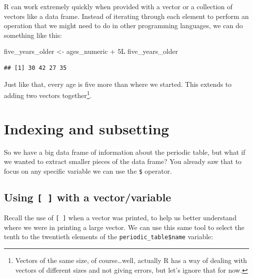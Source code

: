 \documentclass[]{tufte-book}
\newenvironment{Shaded}{\begin{snugshade}}{\end{snugshade}}
\newcommand{\DecValTok}[1]{\textcolor[rgb]{0.00,0.00,0.81}{#1}}
\newcommand{\NormalTok}[1]{#1}
\newcommand{\OtherTok}[1]{\textcolor[rgb]{0.56,0.35,0.01}{#1}}
\newcommand{\SpecialCharTok}[1]{\textcolor[rgb]{0.00,0.00,0.00}{#1}}
\begin{document}
R can work extremely quickly when provided with a vector or a collection of vectors like a data frame. Instead of iterating through each element to perform an operation that we might need to do in other programming languages, we can do something like this:

\begin{Shaded}
\begin{Highlighting}[]
\NormalTok{five\_years\_older }\OtherTok{\textless{}{-}}\NormalTok{ ages\_numeric }\SpecialCharTok{+}\NormalTok{ 5L}
\NormalTok{five\_years\_older}
\end{Highlighting}
\end{Shaded}

\begin{verbatim}
## [1] 30 42 27 35
\end{verbatim}

Just like that, every age is five more than where we started. This extends to adding two vectors together\footnote{Vectors of the same size, of course\ldots well, actually R has a way of dealing with vectors of different sizes and not giving errors, but let's ignore that for now.}.

\hypertarget{index-sub}{%
\section{Indexing and subsetting}\label{index-sub}}

So we have a big data frame of information about the periodic table, but what if we wanted to extract smaller pieces of the data frame? You already saw that to focus on any specific variable we can use the \texttt{\$} operator.

\hypertarget{using-with-a-vectorvariable}{%
\subsection{\texorpdfstring{Using \texttt{{[}\ {]}} with a vector/variable}{Using {[} {]} with a vector/variable}}\label{using-with-a-vectorvariable}}

Recall the use of \texttt{{[}\ {]}} when a vector was printed, to help us better understand where we were in printing a large vector. We can use this same tool to select the tenth to the twentieth elements of the \texttt{periodic\_table\$name} variable:

\begin{Shaded}
\end{Shaded}
\end{document}
